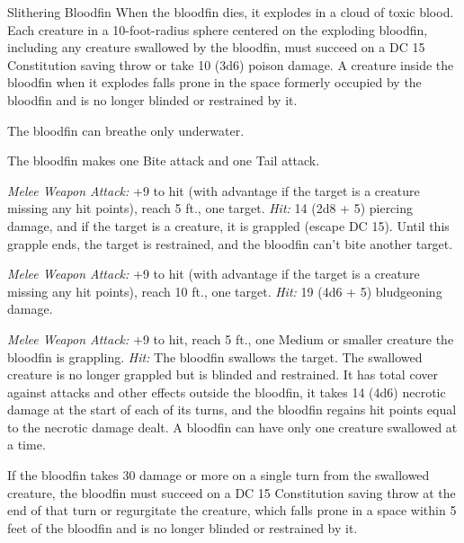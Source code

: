 \documentclass[10pt,a4paper,twoside,fancy,bg=print,twocolumn,openany,nodeprecatedcode]{dndbook}
\begin{document}
\begin{DndMonster}[float=t]{Slithering Bloodfin}
\DndMonsterBasics[
armor-class = {16 (natural armor)},
hit-points = {\DndDice{11d10 + 33}},
speed = {5 ft., swim 50 ft.}
]
\DndMonsterAbilityScores[
 str = 20,
 dex = 14,
 con = 16,
 int = 2,
 wis = 10,
 cha = 3
]
\DndMonsterDetails[
skills = {Perception +4},
damage-immunities = {poison},
senses = {blindsight 100 ft. (blind beyond this radius), passive perception 14},
challenge = 9,
]
When the bloodfin dies, it explodes in a cloud of toxic blood. Each creature in a 10-foot-radius sphere centered on the exploding bloodfin, including any creature swallowed by the bloodfin, must succeed on a DC 15 Constitution saving throw or take 10 (3d6) poison damage. A creature inside the bloodfin when it explodes falls prone in the space formerly occupied by the bloodfin and is no longer blinded or restrained by it.

The bloodfin can breathe only underwater.

The bloodfin makes one Bite attack and one Tail attack.

\textsl{Melee Weapon Attack:} +9 to hit (with advantage if the target is a creature missing any hit points), reach 5 ft., one target. \textsl{Hit:} 14 (2d8 + 5) piercing damage, and if the target is a creature, it is grappled (escape DC 15). Until this grapple ends, the target is restrained, and the bloodfin can't bite another target.

\textsl{Melee Weapon Attack:} +9 to hit (with advantage if the target is a creature missing any hit points), reach 10 ft., one target. \textsl{Hit:} 19 (4d6 + 5) bludgeoning damage.

\textsl{Melee Weapon Attack:} +9 to hit, reach 5 ft., one Medium or smaller creature the bloodfin is grappling. \textsl{Hit:} The bloodfin swallows the target. The swallowed creature is no longer grappled but is blinded and restrained. It has total cover against attacks and other effects outside the bloodfin, it takes 14 (4d6) necrotic damage at the start of each of its turns, and the bloodfin regains hit points equal to the necrotic damage dealt. A bloodfin can have only one creature swallowed at a time.

If the bloodfin takes 30 damage or more on a single turn from the swallowed creature, the bloodfin must succeed on a DC 15 Constitution saving throw at the end of that turn or regurgitate the creature, which falls prone in a space within 5 feet of the bloodfin and is no longer blinded or restrained by it.

\end{DndMonster}
\end{document}
